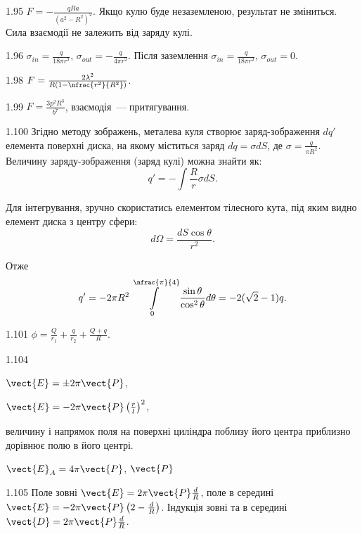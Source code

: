 \begin{Solution}{1.{95}}
	$F = -\frac{qRa}{(a^2 - R^2)^2}$. Якщо кулю буде незаземленою, результат не зміниться. Сила взаємодії не залежить від заряду кулі.
\end{Solution}
\begin{Solution}{1.{96}}
	$\sigma_{in} = \frac{q}{18\pi r^2}$, $\sigma_{out} = - \frac{q}{4\pi r^2}$. Після заземлення $\sigma_{in} = \frac{q}{18\pi r^2}$, $\sigma_{out} = 0$.
\end{Solution}
\begin{Solution}{1.{98}}
	$F = \frac{2\lambda^2}{R\left( 1 - \nfrac{r^2}{R^2}\right) }$.
\end{Solution}
\begin{Solution}{1.{99}}
	$F = \frac{3p^2R^3}{b^7}$, взаємодія~--- притягування.
\end{Solution}
\begin{Solution}{1.{100}}
	Згідно методу зображень, металева куля створює заряд-зображення $dq'$ елемента поверхні диска, на якому міститься заряд $dq = \sigma dS$, де $\sigma = \frac{q}{\pi R^2}$. Величину заряду-зображення (заряд кулі) можна знайти як:
	\[
		q' = - \int\frac{R}{r}\sigma dS.
	\]

	Для інтегрування, зручно скористатись елементом тілесного кута, під яким видно елемент диска з центру сфери:
	\[
		d\Omega = \frac{dS\cos\theta}{r^2}.
	\]

	Отже
	\[
		q' = - 2\pi R^2\int\limits_{0}^{\nfrac{\pi}{4}} \frac{\sin\theta}{\cos^2\theta}d\theta = -2(\sqrt2 - 1)q.
	\]
\end{Solution}
\begin{Solution}{1.{101}}
	$\phi = \frac{Q}{r_1} + \frac{q}{r_2} + \frac{Q+q}{R}$.
\end{Solution}
\begin{Solution}{1.{104}}
		\begin{enumerate*}[label=\alph*)]
			\item $\vect{E} = \pm 2\pi \vect{P}$,
			\item $\vect{E} = -2\pi \vect{P} \left(\frac{r}{l} \right)^2$,
			\item величину і напрямок поля на поверхні циліндра поблизу його центра приблизно дорівнює полю в його центрі.
		\end{enumerate*}
		$\vect{E}_A = 4\pi \vect{P}$, $\vect{P}$
	
\end{Solution}
\begin{Solution}{1.{105}}
		Поле зовні $\vect{E} = 2\pi\vect{P}\frac{d}{R}$, поле в середині $\vect{E} = -2\pi\vect{P}\left( 2 - \frac{d}{R}\right) $.
		Індукція зовні та в середині $\vect{D} = 2\pi\vect{P}\frac{d}{R}$.	
	
\end{Solution}
